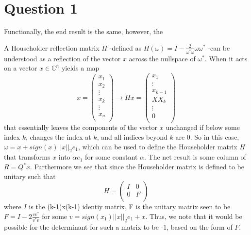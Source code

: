 \documentclass[a4paper,12pt]{article}
\begin{document}
\section{Question 1}

Functionally, the end result is the same, however, the

A Householder reflection matrix $H$ -defined as $H(\omega)=I - \frac{2}{\omega^* \omega}\omega \omega^*$ -can be understood as a reflection of the vector $x$ across the nullspace of $\omega^*$. When it acts on a vector $x\in \mathbb{C}^n$ yields a map
\begin{equation}
x=\begin{pmatrix}
x_1 \\
x_2 \\
\vdots \\
x_k \\
\vdots \\
x_n \\
\end{pmatrix}
\rightarrow
Hx=\begin{pmatrix}
x_1 \\
\vdots \\
x_{k-1} \\
XX_k \\
\vdots \\
0 \\
\end{pmatrix}
\end{equation} that essentially leaves the components of the vector $x$ unchanged if below some index $k$, changes the index at $k$, and all indices beyond $k$ are 0. So in this case, $\omega = x + sign(x) ||x||_2 e_1$, which can be used to define the Householder matrix $H$ that transforms $x$ into $\alpha e_1$ for some constant $\alpha$. The net result is some column of $R=Q^*x$. Furthermore we see that since the Householder matrix is defined to be unitary such that
\begin{equation}
H=\begin{pmatrix}
I & 0\\
0 & F\\
\end{pmatrix}
\end{equation} where $I$ is the (k-1)x(k-1) identiy matrix, F is the unitary matrix seen to be $F=I-2\frac{vv^*}{v^*v}$ for some $v=sign(x_1)||x||_2e_1+x$. Thus, we note that it would be possible for the determinant for such a matrix to be -1, based on the form of $F$.
\end{document}
